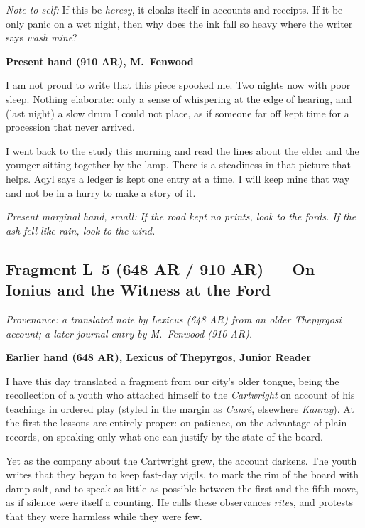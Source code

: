 \documentclass[11pt]{article}
\begin{document}
\medskip
\noindent\textit{Note to self:} If this be \emph{heresy}, it cloaks itself in accounts and receipts. If it be only panic on a wet night, then why does the ink fall so heavy where the writer says \emph{wash mine}?

\medskip
\noindent\textbf{Present hand (910 AR), M.\ Fenwood}

I am not proud to write that this piece spooked me. Two nights now with poor sleep. Nothing elaborate: only a sense of whispering at the edge of hearing, and (last night) a slow drum I could not place, as if someone far off kept time for a procession that never arrived.

I went back to the study this morning and read the lines about the elder and the younger sitting together by the lamp. There is a steadiness in that picture that helps. Aqyl says a ledger is kept one entry at a time. I will keep mine that way and not be in a hurry to make a story of it.

\medskip
\noindent\textit{Present marginal hand, small:} \emph{If the road kept no prints, look to the fords. If the ash fell like rain, look to the wind.}

\subsection*{Fragment L--5 (648 AR / 910 AR) --- On Ionius and the Witness at the Ford}
\label{frag:l5}
{}

\noindent\textit{Provenance: a translated note by Lexicus (648 AR) from an older Thepyrgosi account; a later journal entry by M.\ Fenwood (910 AR).}

\medskip
\noindent\textbf{Earlier hand (648 AR), Lexicus of Thepyrgos, Junior Reader}

I have this day translated a fragment from our city’s older tongue, being the recollection of a youth who attached himself to the \textit{Cartwright} on account of his teachings in ordered play (styled in the margin as \textit{Canr\'e}, elsewhere \textit{Kanray}). At the first the lessons are entirely proper: on patience, on the advantage of plain records, on speaking only what one can justify by the state of the board. 

Yet as the company about the Cartwright grew, the account darkens. The youth writes that they began to keep fast-day vigils, to mark the rim of the board with damp salt, and to speak as little as possible between the first and the fifth move, as if silence were itself a counting. He calls these observances \textit{rites}, and protests that they were harmless while they were few.
\end{document}
